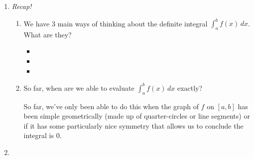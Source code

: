 \documentclass[main]{subfiles}
\begin{document}
\begin{enumerate}
\item \emph{Recap!}
  \begin{enumerate}
  \item
    \begin{problem}
      We have 3 main ways of thinking about the definite integral
      $\displaystyle \int_a^b f(x)\,dx$.  What are they?
    \end{problem}

      \begin{itemize}
      \item
        \pspace{36pt}
      \item
        \pspace{36pt}
      \item
        \pspace{36pt}
      \end{itemize}
        \pspace{36pt}
  \item
    \begin{problem}[\vfill]
      So far, when are we able to evaluate $\displaystyle \int_a^b
      f(x)\,dx$ exactly?
    \end{problem}

    \begin{solution}
      So far, we've only been able to do this when the graph of $f$ on
      $[a, b]$ has been simple geometrically (made up of quarter-circles
      or line segments) or if it has some particularly nice symmetry that
      allows us to conclude the integral is 0.
    \end{solution}

  \end{enumerate}

\item 


\end{enumerate}
\end{document}

